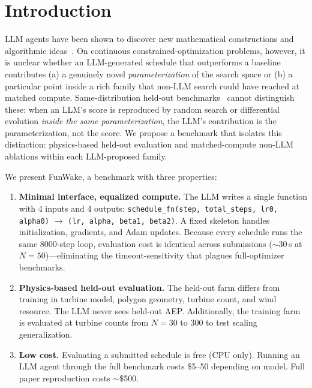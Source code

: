 \section{Introduction}
\label{sec:intro}

LLM agents have been shown to discover new mathematical
constructions and algorithmic
ideas~\cite{fawzi2024funsearch,deepmind2025alphaevolve}. On
continuous constrained-optimization problems, however, it is
unclear whether an LLM-generated schedule that outperforms a
baseline contributes (a) a genuinely novel \emph{parameterization}
of the search space or (b) a particular point inside a rich family
that non-LLM search could have reached at matched compute.
Same-distribution held-out benchmarks~\cite{yao2025heurigym} cannot
distinguish these: when an LLM's score is reproduced by random
search or differential evolution \emph{inside the same
parameterization}, the LLM's contribution is the parameterization,
not the score. We propose a benchmark that isolates this
distinction: physics-based held-out evaluation and matched-compute
non-LLM ablations within each LLM-proposed family.

We present FunWake, a benchmark with three properties:

\begin{enumerate}[nosep]
    \item \textbf{Minimal interface, equalized compute.} The LLM writes
    a single function with 4 inputs and 4 outputs:
    \texttt{schedule\_fn(step, total\_steps, lr0, alpha0)} $\to$
    \texttt{(lr, alpha, beta1, beta2)}. A fixed skeleton handles
    initialization, gradients, and Adam updates. Because every schedule
    runs the same 8000-step loop, evaluation cost is identical across
    submissions ($\sim$30\,s at $N\!=\!50$)---eliminating the
    timeout-sensitivity that plagues full-optimizer benchmarks.
    \item \textbf{Physics-based held-out evaluation.} The held-out
    farm differs from training in turbine model, polygon geometry,
    turbine count, and wind resource. The LLM never sees held-out AEP.
    Additionally, the training farm is evaluated at turbine
    counts from $N=30$ to $300$ to test scaling generalization.
    \item \textbf{Low cost.} Evaluating a submitted schedule is free
    (CPU only). Running an LLM agent through the full benchmark costs
    \$5--50 depending on model. Full paper reproduction costs
    $\sim$\$500.
\end{enumerate}

